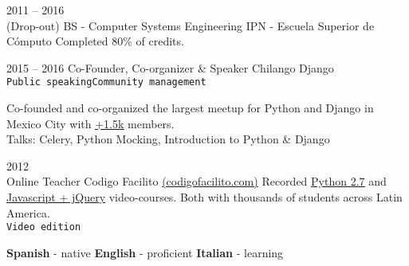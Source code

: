 \documentclass[9pt]{developercv} %
\begin{document}


\begin{entrylist}
    \entry
        {
            2011 -- 2016
            \\\footnotesize{(Drop-out)}
        }
        {BS - Computer Systems Engineering}
        {IPN - Escuela Superior de Cómputo}
        {Completed 80\% of credits.}
\end{entrylist}


\begin{entrylist}
    \entry
        {2015 -- 2016}
        {Co-Founder, Co-organizer \& Speaker}
        {
            Chilango Django \\
            \texttt{Public speaking}\slashsep\texttt{Community management}
        }
        {
            
            Co-founded and co-organized the largest meetup for Python and Django in 
            Mexico City with {\href{https://meetup.com/Chilango-Django/}{\underline{+1.5k}}} members. \\

            \small{Talks: Celery, Python Mocking, Introduction to Python \& Django}
            
        }
    \entry
        {2012\\\footnotesize{Online}}
        {Teacher}
        {Codigo Facilito {\href{(https://codigofacilito.com/}{(codigofacilito.com)}}}
        {
            Recorded 
            {\href{https://www.youtube.com/watch?v=CjmzDHMHxwU&list=PLE549A038CF82905F}{\underline{Python 2.7}}} 
            and {\href{https://www.youtube.com/watch?v=jKbjblt4NXA&list=PLpOqH6AE0tNi47LF-_6gddgq10lp_TLDB}{\underline{Javascript + jQuery}}} 
            video-courses. Both with thousands of students across Latin America.\\
            \texttt{Video edition}
        }
\end{entrylist}


\begin{minipage}[t]{1\textwidth}
    \vspace{-\baselineskip} %
    \textbf{Spanish} - native
    \slashsep\textbf{English} - proficient
    \slashsep\textbf{Italian} - learning
\end{minipage}
\end{document}

